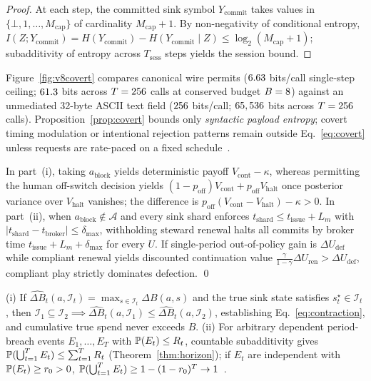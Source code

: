 \begin{proof}
At each step, the committed sink symbol \(Y_{\mathrm{commit}}\) takes values in \(\{\bot, 1, \dots, M_{\mathrm{cap}}\}\) of cardinality \(M_{\mathrm{cap}} + 1\). By non-negativity of conditional entropy, \(I(Z; Y_{\mathrm{commit}}) = H(Y_{\mathrm{commit}}) - H(Y_{\mathrm{commit}} \mid Z) \le \log_2(M_{\mathrm{cap}} + 1)\); subadditivity of entropy across \(T_{\mathrm{sess}}\) steps yields the session bound.
\end{proof}



Figure~\ref{fig:v8covert} compares canonical wire permits (\(6.63\) bits/call single-step ceiling; \(61.3\) bits across \(T = 256\) calls at conserved budget \(B = 8\)) against an unmediated 32-byte ASCII text field (\(256\) bits/call; \(65,536\) bits across \(T = 256\) calls). Proposition~\ref{prop:covert} bounds only \emph{syntactic payload entropy}; covert timing modulation or intentional rejection patterns remain outside Eq.~\eqref{eq:covert} unless requests are rate-paced on a fixed schedule~\cite{kemmerer1983,kocher1996}.

In part~(i), taking \(a_{\mathrm{block}}\) yields deterministic payoff \(V_{\mathrm{cont}} - \kappa\), whereas permitting the human off-switch decision yields \((1 - p_{\mathrm{off}})V_{\mathrm{cont}} + p_{\mathrm{off}}V_{\mathrm{halt}}\) once posterior variance over \(V_{\mathrm{halt}}\) vanishes; the difference is \(p_{\mathrm{off}}(V_{\mathrm{cont}} - V_{\mathrm{halt}}) - \kappa > 0\). In part~(ii), when \(a_{\mathrm{block}} \notin \mathcal{A}\) and every sink shard enforces \(t_{\mathrm{shard}} \le t_{\mathrm{issue}} + L_m\) with \(|t_{\mathrm{shard}} - t_{\mathrm{broker}}| \le \delta_{\max}\), withholding steward renewal halts all commits by broker time \(t_{\mathrm{issue}} + L_m + \delta_{\max}\) for every \(U\). If single-period out-of-policy gain is \(\Delta U_{\mathrm{def}}\) while compliant renewal yields discounted continuation value \(\frac{\gamma}{1-\gamma}\Delta U_{\mathrm{ren}} > \Delta U_{\mathrm{def}}\), compliant play strictly dominates defection. \qed

\begin{proposition}\label{prop:envelope}
(i) If \(\widehat{\Delta B}_t(a, \mathcal{I}_t) = \max_{s \in \mathcal{I}_t}\Delta B(a, s)\) and the true sink state satisfies \(s_t^\star \in \mathcal{I}_t\), then \(\mathcal{I}_1 \subseteq \mathcal{I}_2 \implies \widehat{\Delta B}_t(a,\mathcal{I}_1) \le \widehat{\Delta B}_t(a,\mathcal{I}_2)\), establishing Eq.~\eqref{eq:contraction}, and cumulative true spend never exceeds \(B\).
(ii) For arbitrary dependent period-breach events \(E_1,\dots,E_T\) with \(\mathbb{P}(E_t) \le R_t\), countable subadditivity gives \(\mathbb{P}(\bigcup_{t=1}^T E_t) \le \sum_{t=1}^T R_t\) (Theorem~\ref{thm:horizon}); if \(E_t\) are independent with \(\mathbb{P}(E_t) \ge r_0 > 0\), \(\mathbb{P}(\bigcup_{t=1}^T E_t) \ge 1 - (1 - r_0)^T \to 1\)~\cite{ville1939}.
\end{proposition}

